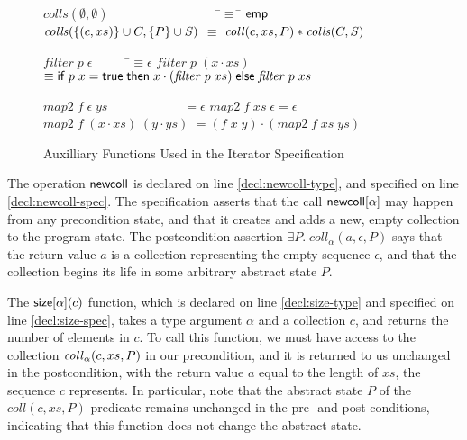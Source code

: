 \begin{figure}
\mbox{}
\begin{specification}
\nextline
$\mathit{colls}(\emptyset, \emptyset) \qquad\qquad\qquad\qquad\;\;$ \=$\equiv\;$\= $\mathsf{emp}$ 
\nextline
$\mathit{colls}(\{{(c,xs)}\} \cup C, \{{P}\} \cup S)$ \> $\equiv$ \> $\mathit{coll}(c, xs, P) * \mathit{colls}(C, S)$ 

$\mathit{filter}\;p\;\epsilon \qquad\quad$\=$\equiv \epsilon$
\nextline
$\mathit{filter}\;p\;(x\cdot xs)$ \> $\equiv \mathsf{if}\;p\;x = \mathsf{true}\;\mathsf{then}\;
                                         x\cdot(\mathit{filter}\;p\;xs)\;
                                      \mathsf{else}\; \mathit{filter}\;p\;xs$ 

$\mathit{map2}\;f\;\epsilon\;ys \qquad\qquad\qquad $\=$= \epsilon$ 
\nextline
$\mathit{map2}\;f\;xs\;\epsilon $\>$= \epsilon$ 
\nextline
$\mathit{map2}\;f\;(x\cdot xs)\;(y\cdot ys)$ \>$= (f\;x\;y)\cdot(\mathit{map2}\;f\;xs\;ys)$
    
\end{specification}
\caption{Auxilliary Functions Used in the Iterator Specification}
\label{iterator-interface-aux}
\end{figure}

The operation $\mathsf{newcoll}$ is declared on line \ref{decl:newcoll-type},
and specified on line \ref{decl:newcoll-spec}. The specification
asserts that the call $\mathsf{newcoll}[\alpha]$ may happen from any
precondition state, and that it creates and adds a new, empty
collection to the program state. The postcondition assertion $\exists
P.\; coll_\alpha(a, \epsilon, P)$ says that the return value $a$ is a
collection representing the empty sequence $\epsilon$, and that the
collection begins its life in some arbitrary abstract state $P$.

The $\mathsf{size}[\alpha](c)$ function, which is declared on line
\ref{decl:size-type} and specified on line \ref{decl:size-spec}, takes
a type argument $\alpha$ and a collection $c$, and returns the number
of elements in $c$. To call this function, we must have access to the
collection $\mathit{coll}_\alpha(c, xs, P)$ in our precondition, and it is
returned to us unchanged in the postcondition, with the return value
$a$ equal to the length of $xs$, the sequence $c$ represents. In
particular, note that the abstract state $P$ of the $coll(c, xs, P)$
predicate remains unchanged in the pre- and post-conditions,
indicating that this function does not change the abstract state.


